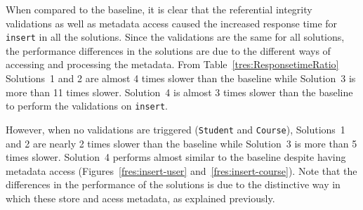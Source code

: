 When compared to the baseline,  it is clear that the referential integrity
validations as well as metadata access caused the increased response time for
\texttt{insert} in all the solutions.  Since the validations are the same for
all solutions,  the performance differences in the solutions are due to the
different ways of accessing and processing the metadata.  From
Table~\ref{tres:ResponsetimeRatio} Solutions~1 and 2  are almost 4 times slower
than the baseline while Solution~3 is more than 11 times slower.  Solution~4 is
almost 3 times slower than the baseline to perform the validations on
\texttt{insert}.

However,  when no validations are triggered (\texttt{Student} and
\texttt{Course}),   Solutions~1 and 2 are nearly 2 times slower than the
baseline while Solution~3 is  more than 5 times slower.  Solution~4 performs
almost similar to the baseline  despite having metadata access
(Figures~\ref{fres:insert-user} and~\ref{fres:insert-course}). Note that the
differences in the performance of the solutions is due to the distinctive way in
which these store and acess metadata, as explained previously.


